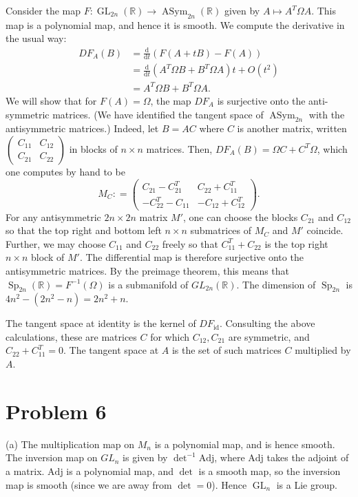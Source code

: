 \documentclass{amsart}
\numberwithin{equation}{section}
\theoremstyle{plain}
\theoremstyle{definition}
\theoremstyle{remark}
\renewcommand{\_}[2]{\underbrace{#1}_{#2}}
\renewcommand{\^}[2]{\overbrace{#1}_{#2}}
\newcommand{\R}{\mathbb{R}}
\newcommand{\GL}{\operatorname{GL}}
\newcommand{\Sp}{\operatorname{Sp}}
\newcommand{\ASym}{\operatorname{ASym}}
\renewcommand{\d}{\mathrm{d}}
\begin{document}
Consider the map $F: \GL_{2n}(\R) \to \ASym_{2n}(\R)$ given by $A \mapsto A^T\Omega A$. This map is a polynomial map, and hence it is smooth. We compute the derivative in the usual way:
\begin{align*}
  DF_A(B) &= \frac{\d}{\d t} \left( F(A+tB) - F(A) \right) \\
          &= \frac{\d}{\d t} \left( A^T \Omega B + B^T \Omega A \right) t + O(t^2) \\
          &= A^T \Omega B + B^T \Omega A.
\end{align*}
We will show that for $F(A) = \Omega$, the map $DF_A$ is surjective onto the anti-symmetric matrices. (We have identified the tangent space of $\ASym_{2n}$ with the antisymmetric matrices.) Indeed, let $B = AC$ where $C$ is another matrix, written $
\begin{pmatrix}
  C_{11} & C_{12}\\
  C_{21} & C_{22}
\end{pmatrix}$ in blocks of $n\times n$ matrices. Then, $DF_A(B) = \Omega C + C^T \Omega$, which one computes by hand to be $$M_C: = 
\begin{pmatrix}
  C_{21} - C_{21}^T & C_{22} + C_{11}^T \\
  -C_{22}^T - C_{11} & -C_{12} + C_{12}^T
\end{pmatrix}.$$For any antisymmetric $2n\times 2n$ matrix $M'$, one can choose the blocks $C_{21}$ and $C_{12}$ so that the top right and bottom left $n\times n$ submatrices of $M_C$ and $M'$ coincide. Further, we may choose $C_{11}$ and $C_{22}$ freely so that $C_{11}^T + C_{22}$ is the top right $n\times n$ block of $M'$. The differential map is therefore surjective onto the antisymmetric matrices. By the preimage theorem, this means that $\Sp_{2n}(\R) = F^{-1}(\Omega)$ is a submanifold of $GL_{2n}(\R)$. The dimension of $\Sp_{2n}$ is $4n^2 - (2n^2 - n) = 2n^2 + n$.

The tangent space at identity is the kernel of $DF_\mathrm{id}$. Consulting the above calculations, these are matrices $C$ for which $C_{12}, C_{21}$ are symmetric, and $C_{22} + C_{11}^T = 0$. The tangent space at $A$ is the set of such matrices $C$ multiplied by $A$.

\section*{Problem 6}
(a) The multiplication map on $M_n$ is a polynomial map, and is hence smooth. The inversion map on $GL_n$ is given by $\det ^{-1} \mathrm{Adj}$, where $\mathrm{Adj}$ takes the adjoint of a matrix. $\mathrm{Adj}$ is a polynomial map, and $\det$ is a smooth map, so the inversion map is smooth (since we are away from $\det = 0$). Hence $\GL_n$ is a Lie group.
\end{document}
